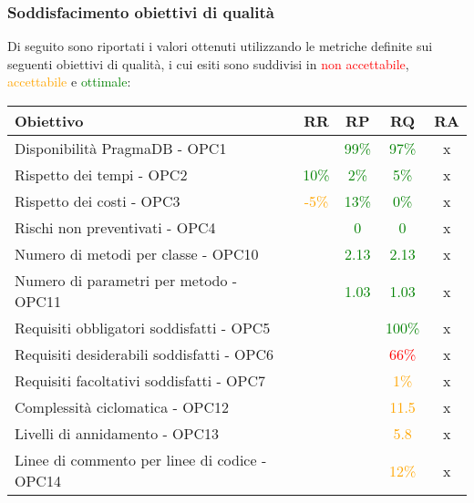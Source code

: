 \documentclass[PdQ.tex]{subfiles}
\begin{document}
\subsubsection{Soddisfacimento obiettivi di qualità}
			Di seguito sono riportati i valori ottenuti utilizzando le metriche definite sui seguenti obiettivi di qualità, i cui esiti sono suddivisi in \textcolor{red}{non accettabile}, \textcolor{orange}{accettabile} e \textcolor{green}{ottimale}:
			\begin{table}[H]
				\centering
				\begin{tabular}{l c c c c}
					\hline
					\rule[-0.3cm]{0cm}{0.8cm}
					\textbf{Obiettivo} & \textbf{RR} & \textbf{RP} & \textbf{RQ} & \textbf{RA}\\
					\hline
					\rule[0cm]{0cm}{0.4cm}
					Disponibilità PragmaDB - OPC1 & & \textcolor{green}{99\%} & \textcolor{green}{97\%} & x\\
					\rule[0cm]{0cm}{0.4cm}
					Rispetto dei tempi - OPC2 & \textcolor{green}{10\%} & \textcolor{green}{2\%} & \textcolor{green}{5\%} & x \\
					\rule[0cm]{0cm}{0.4cm}
					Rispetto dei costi - OPC3 & \textcolor{orange}{-5\%} & \textcolor{green}{13\%} & \textcolor{green}{0\%} & x\\
					\rule[0cm]{0cm}{0.4cm}
					Rischi non preventivati - OPC4 & & \textcolor{green}{0} & \textcolor{green}{0} & x\\
					\rule[0cm]{0cm}{0.4cm}
					Numero di metodi per classe - OPC10 & & \textcolor{green}{2.13} & \textcolor{green}{2.13} & x \\
					\rule[0cm]{0cm}{0.4cm}
					Numero di parametri per metodo - OPC11 & & \textcolor{green}{1.03} & \textcolor{green}{1.03} & x\\
					\rule[0cm]{0cm}{0.4cm}
					Requisiti obbligatori soddisfatti - OPC5 & & & \textcolor{green}{100\%} & x \\
					\rule[0cm]{0cm}{0.4cm}
					Requisiti desiderabili soddisfatti - OPC6 & & & \textcolor{red}{66\%} & x \\
					\rule[0cm]{0cm}{0.4cm}
					Requisiti facoltativi soddisfatti - OPC7 & & & \textcolor{orange}{1\%} & x \\
					\rule[0cm]{0cm}{0.4cm}
					Complessità ciclomatica - OPC12 & & & \textcolor{orange}{11.5} & x \\
					\rule[0cm]{0cm}{0.4cm}
					Livelli di annidamento - OPC13 & & & \textcolor{orange}{5.8} & x\\
					\rule[0cm]{0cm}{0.4cm}
					Linee di commento per linee di codice - OPC14 & & & \textcolor{orange}{12\%} & x \\

\end{tabular}
\end{table}
\end{document}
